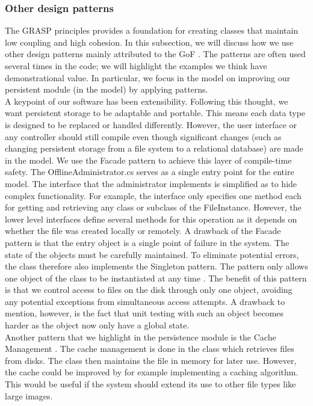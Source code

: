 \subsubsection{Other design patterns}
The GRASP principles provides a foundation for creating classes that maintain low coupling and high cohesion. In this subsection, we will discuss how we use other design patterns mainly attributed to the GoF \cite[p.~342]{OOAD}. The patterns are often used several times in the code; we will highlight the examples we think have demonstrational value. In particular, we focus in the model on improving our persistent module (in the model) by applying patterns.\\
\newline
A keypoint of our software has been extensibility. Following this thought, we want persistent storage to be adaptable and portable. This means each data type is designed to be replaced or handled differently. However, the user interface or any controller should still compile even though significant changes (such as changing persistent storage from a file system to a relational database) are made in the model. We use the Facade pattern to achieve this layer of compile-time safety. The OfflineAdministrator.cs serves as a single entry point for the entire model. The interface that the administrator implements is simplified as to hide complex functionality. For example, the interface only specifies one method each for getting and retrieving any class or subclass of the FileInstance. However, the lower level interfaces define several methods for this operation as it depends on whether the file was created locally or remotely. 
A drawback of the Facade pattern is that the entry object is a single point of failure in the system. The state of the objects must be carefully maintained. To eliminate potential errors, the class therefore also implements the Singleton pattern. The pattern only allows one object of the class to be instantiated at any time \cite[p.~348]{OOAD}. The benefit of this pattern is that we control access to files on the disk through only one object, avoiding any potential exceptions from simultaneous access attempts. A drawback to mention, however, is the fact that unit testing
with such an object becomes harder as the object now only have a global state.\\
\newline
Another pattern that we highlight in the persistence module is the Cache Management \cite[p.~551]{OOAD}. The cache management is done in the class which retrieves files from disks. The class then maintains the file in memory for later use. However, the cache could be improved by for example implementing a caching algorithm. This would be useful if the system should extend its use to other file types like large images.\cite{cachingalgorithm} \\
